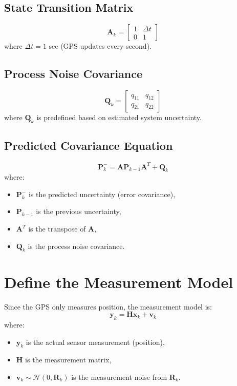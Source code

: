 \documentclass{article}
\begin{document}
\subsection{State Transition Matrix}
\[
\mathbf{A}_k =
\begin{bmatrix}
1 & \Delta t \\
0 & 1
\end{bmatrix}
\]
where $\Delta t = 1$ sec (GPS updates every second).

\subsection{Process Noise Covariance}
\[
\mathbf{Q}_k =
\begin{bmatrix}
q_{11} & q_{12} \\
q_{21} & q_{22}
\end{bmatrix}
\]
where $\mathbf{Q}_k$ is predefined based on estimated system uncertainty.

\subsection{Predicted Covariance Equation}
\[
\mathbf{P}_k^- = \mathbf{A} \mathbf{P}_{k-1} \mathbf{A}^T + \mathbf{Q}_k
\]
where:
\begin{itemize}
    \item $\mathbf{P}_k^-$ is the predicted uncertainty (error covariance),
    \item $\mathbf{P}_{k-1}$ is the previous uncertainty,
    \item $\mathbf{A}^T$ is the transpose of $\mathbf{A}$,
    \item $\mathbf{Q}_k$ is the process noise covariance.
\end{itemize}

\section{Define the Measurement Model}
Since the GPS only measures position, the measurement model is:
\[
\mathbf{y}_k = \mathbf{H} \mathbf{x}_k + \mathbf{v}_k
\]
where:
\begin{itemize}
    \item $\mathbf{y}_k$ is the actual sensor measurement (position),
    \item $\mathbf{H}$ is the measurement matrix,
    \item $\mathbf{v}_k \sim \mathcal{N}(0, \mathbf{R}_k)$ is the measurement noise from $\mathbf{R}_k$.
\end{itemize}
\end{document}
